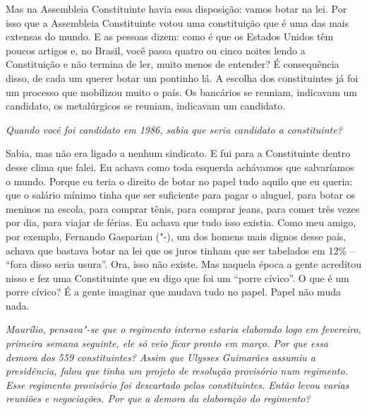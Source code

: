 Mas na Assembleia Constituinte havia essa disposição: vamos botar na
lei. Por isso que a Assembleia Constituinte votou uma constituição que é
uma das mais extensas do mundo. E as pessoas dizem: como é que os
Estados Unidos têm poucos artigos e, no Brasil, você passa quatro ou
cinco noites lendo a Constituição e não termina de ler, muito menos de
entender? É consequência disso, de cada um querer botar um pontinho lá.
A escolha dos constituintes já foi um processo que mobilizou muito o
país. Os bancários se reuniam, indicavam um candidato, os metalúrgicos
se reuniam, indicavam um candidato.

\medskip

\noindent\emph{Quando você foi candidato em 1986, sabia que seria candidato a
constituinte?}

Sabia, mas não era ligado a nenhum sindicato. E fui
para a Constituinte dentro desse clima que falei. Eu achava como toda
esquerda achávamos que salvaríamos o mundo. Porque eu teria o direito
de botar no papel tudo aquilo que eu queria: que o salário mínimo tinha
que ser suficiente para pagar o aluguel, para botar os meninos na
escola, para comprar tênis, para comprar jeans, para comer três vezes
por dia, para viajar de férias. Eu achava que tudo isso existia. Como
meu amigo, por exemplo, Fernando Gasparian ("-), um dos homens mais
dignos desse país, achava que bastava botar na lei que os juros tinham
que ser tabelados em 12\% -- ``fora disso seria usura''. Ora,
isso não existe. Mas naquela época a gente acreditou nisso e fez uma
Constituinte que eu digo que foi um ``porre cívico''. O que é um porre
cívico? É a gente imaginar que mudava tudo no papel. Papel não muda
nada.

\medskip

\noindent\emph{Maurílio, pensava"-se que o regimento interno estaria elaborado
logo em fevereiro, primeira semana seguinte, ele só veio ficar pronto em
março. Por que essa demora dos 559 constituintes? Assim que Ulysses
Guimarães assumiu a presidência, falou que tinha um projeto de resolução
provisório num regimento. Esse regimento provisório foi descartado pelos
constituintes. Então levou varias reuniões e negociações. Por que a
demora da elaboração do regimento?}

